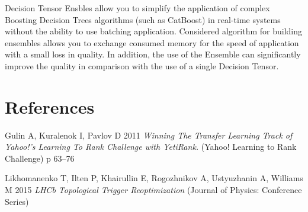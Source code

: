 \documentclass[a4paper]{jpconf}
\begin{document}
Decision Tensor Ensbles allow you to simplify the application of complex Boosting Decision Trees algorithms (such as CatBoost) in real-time systems without the ability to use batching application.
Considered algorithm for building ensembles allows you to exchange consumed memory for the speed of application with a small loss in quality.
In addition, the use of the Ensemble can significantly improve the quality in comparison with the use of a single Decision Tensor.


\section*{References}
\item Gulin A, Kuralenok I, Pavlov D 2011 {\it Winning The Transfer Learning Track of Yahoo!'s Learning To Rank Challenge with YetiRank.} (Yahoo! Learning to Rank Challenge) p 63--76
\item Likhomanenko T, Ilten P, Khairullin E, Rogozhnikov A, Ustyuzhanin A, Williams M 2015 {\it LHCb Topological Trigger Reoptimization} (Journal of Physics: Conference Series)
\endnumrefs
\end{document}
